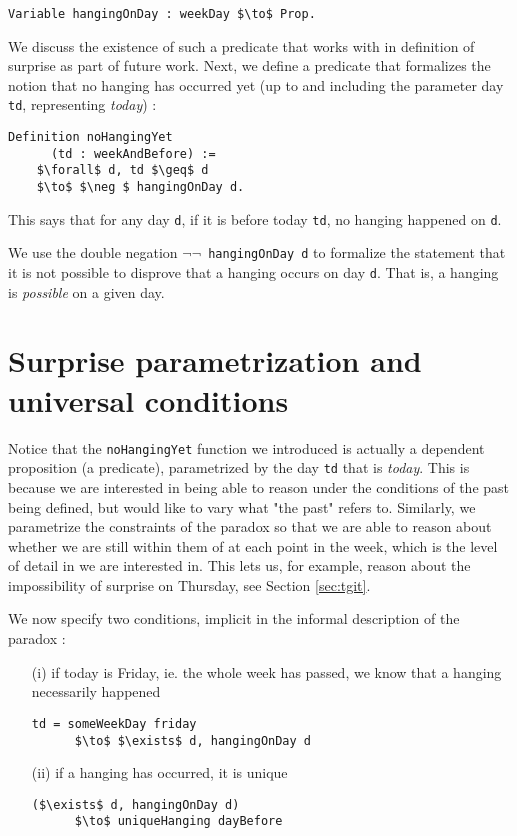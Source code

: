 \documentclass[journal]{journal}
\begin{document}
\begin{lstlisting}[mathescape=true]
  Variable hangingOnDay : weekDay $\to$ Prop.
\end{lstlisting}

We discuss the existence of such a predicate that
works with in definition of surprise as part of future work.
Next, we define a predicate that formalizes the notion that no hanging has occurred
yet (up to and including the parameter day {\tt td}, representing \emph{today}) :

\begin{lstlisting}[mathescape=true]
  Definition noHangingYet
      (td : weekAndBefore) :=
    $\forall$ d, td $\geq$ d
    $\to$ $\neg $ hangingOnDay d.
\end{lstlisting}

This says that for any day {\tt d}, if it is before today {\tt td}, no hanging
happened on {\tt d}.

We use the double negation {\tt $\neg \neg$ hangingOnDay d} to formalize the statement that it is
not possible to disprove that a hanging occurs on day {\tt d}. That is, a hanging
is \emph{possible} on a given day.

\section{Surprise parametrization and universal conditions}
\label{sec:universal}

Notice that the {\tt noHangingYet} function we introduced is actually a
dependent proposition (a predicate), parametrized by
the day {\tt td} that is \emph{today}. This is because we are interested in
being able to reason under the conditions of the past being defined, but
would like to vary what "the past" refers to. Similarly, we parametrize the
constraints of the paradox so that we are able to reason about
whether we are still within them of at each point in the week,
which is the level of detail in we are interested in. This lets us, for example,
reason about the impossibility of surprise on Thursday, see Section \ref{sec:tgit}.

We now specify two conditions, implicit in the informal
description of the paradox :

\begin{itemize}
  \item[(i)] if today is Friday, ie. the whole
  week has passed, we know that a hanging necessarily happened
  \begin{lstlisting}[mathescape=true]
    td = someWeekDay friday
      $\to$ $\exists$ d, hangingOnDay d
  \end{lstlisting}
  \item[(ii)] if a hanging has occurred, it is unique
  \begin{lstlisting}[mathescape=true]
    ($\exists$ d, hangingOnDay d)
      $\to$ uniqueHanging dayBefore
  \end{lstlisting}
\end{itemize}
\end{document}
